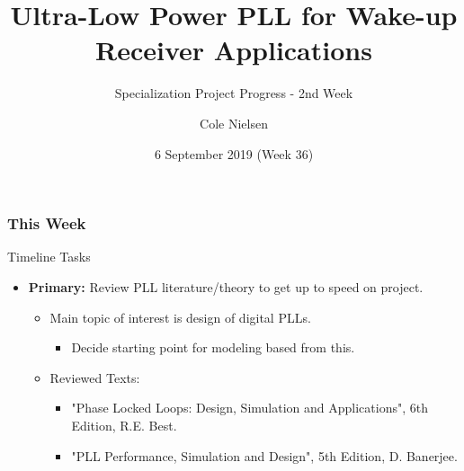 \documentclass[t, screen, aspectratio=43]{beamer}
\title[Short title]{Ultra-Low Power PLL for Wake-up Receiver Applications}
\subtitle{Specialization Project Progress - 2nd Week}
\author[C Nielsen]{Cole Nielsen}
\institute[NTNU]{Department of Electronic Systems, NTNU}
\date{6 September 2019 (Week 36)}
\begin{document}
\begin{frame}
\titlepage%
\end{frame}



\begin{frame}
	\frametitle{This Week}
	\begin{block}{Timeline Tasks}
		\begin{itemize}
			\footnotesize
			\item \textbf{Primary:} Review PLL literature/theory to get up to speed on project.
			\begin{itemize}
				\footnotesize
				\item Main topic of interest is design of digital PLLs.
				\begin{itemize}
					\item Decide starting point for modeling based from this.
				\end{itemize} 
				\item Reviewed Texts:	
				\begin{itemize}
					\footnotesize
					\item "Phase Locked Loops: Design, Simulation and Applications", 6th Edition, R.E. Best.
					\item "PLL Performance, Simulation and Design", 5th Edition, D. Banerjee. 
				\end{itemize}
			\end{itemize} 

		\end{itemize}    
	\end{block}
\end{frame}

\end{document}
